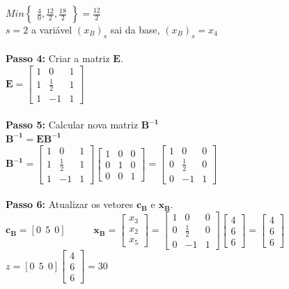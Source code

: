 {\begin{minipage}[l]{14,2cm}
$Min\begin{Bmatrix}
\frac{4}{0},\frac{12}{2},\frac{18}{2}
\end{Bmatrix} = \frac{12}{2}$\\
$s=2$ a variável $(x_{B})_{s}$ sai da base, $(x_{B})_{s}=x_{4}$ 
\\ \\
\textbf{Passo 4:} Criar a matriz $\mathbf{E}$.
\\$\mathbf{E}=\begin{bmatrix}
1 & 0 & 1\\
1 & \frac{1}{2} & 1\\
1 & -1 & 1
\end{bmatrix}$
\\ \\
\textbf{Passo 5:} Calcular nova matriz $\mathbf{B^{-1}}$ 
\\$\mathbf{B^{-1}} = \mathbf{EB^{-1}}$
\\$\mathbf{B^{-1}} = \begin{bmatrix}
1 & 0 & 1\\
1 & \frac{1}{2} & 1\\
1 & -1 & 1
\end{bmatrix}\begin{bmatrix}
1 & 0 & 0 \\
0 & 1 & 0 \\
0 & 0 & 1
\end{bmatrix}=\begin{bmatrix}
1 & 0 & 0 \\
0 & \frac{1}{2} & 0 \\
0 & -1 & 1
\end{bmatrix}$
\\ \\
\textbf{Passo 6:} Atualizar os vetores $\mathbf{c{_B}}$ e $\mathbf{x{_B}}$.
\\$\mathbf{c{_B}}=[0\ \ 5\ \ 0]$
 \ \ \ \ \ 
$\mathbf{x{_B}}=\begin{bmatrix}
x{_3} \\
x{_2} \\
x{_5} 
\end{bmatrix} = \begin{bmatrix}
1 & 0 & 0 \\
0 & \frac{1}{2} & 0 \\
0 & -1 & 1
\end{bmatrix}\begin{bmatrix}
4 \\
6 \\
6 
\end{bmatrix} = \begin{bmatrix}
4 \\
6 \\
6 
\end{bmatrix}$
 \ \ \ \ \ $z = [0\ \ 5\ \ 0]\begin{bmatrix}
4 \\
6 \\
6 
\end{bmatrix} = 30$
\end{minipage}
}

